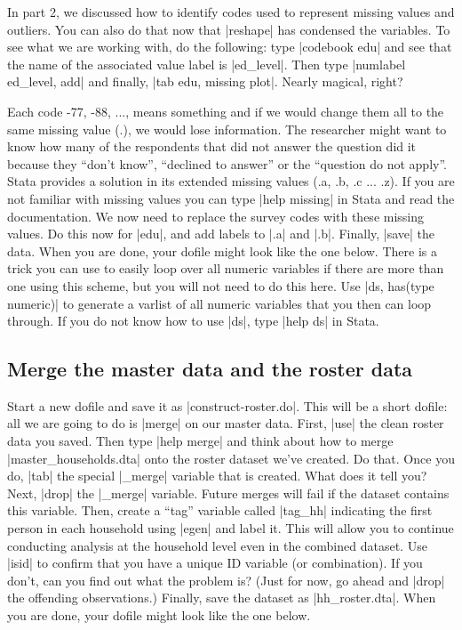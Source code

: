 \documentclass{tufte-handout}
\begin{document}
In part 2, we discussed how to identify codes
used to represent missing values and outliers.
You can also do that now that |reshape| has condensed the variables.
To see what we are working with, do the following:
type |codebook edu| and see that the name of
the associated value label is |ed_level|.
Then type |numlabel ed_level, add| and finally,
|tab edu, missing plot|. Nearly magical, right?

Each code -77, -88, ..., means something and
if we would change them all to the same missing value (.),
we would lose information.
The researcher might want to know how many
of the respondents that did not answer the question did it
because they “don’t know”, “declined to answer” or the “question do not apply”.
Stata provides a solution in its extended missing values (.a, .b, .c ... .z).
If you are not familiar with missing values you can type |help missing|
in Stata and read the documentation.
We now need to replace the survey codes with these missing values.
Do this now for |edu|, and add labels to |.a| and |.b|.
Finally, |save| the data.
When you are done, your dofile might look like the one below.
There is a trick you can use to easily loop over all numeric variables
if there are more than one using this scheme,
but you will not need to do this here.
Use |ds, has(type numeric)| to generate a varlist of all numeric variables
that you then can loop through.
If you do not know how to use |ds|, type |help ds| in Stata.

\subsection{Merge the master data and the roster data}

Start a new dofile and save it as |construct-roster.do|.
This will be a short dofile: all we are going to do is |merge| on our master data.
First, |use| the clean roster data you saved.
Then type |help merge| and think about how to merge
|master_households.dta| onto the roster dataset we’ve created. Do that.
Once you do, |tab| the special |_merge| variable that is created.
What does it tell you? Next, |drop| the |_merge| variable.
Future merges will fail if the dataset contains this variable.
Then, create a “tag” variable called |tag_hh|
indicating the first person in each household using |egen| and label it.
This will allow you to continue conducting analysis at the household level
even in the combined dataset.
Use |isid| to confirm that you have a unique ID variable (or combination).
If you don’t, can you find out what the problem is?
(Just for now, go ahead and |drop| the offending observations.)
Finally, save the dataset as |hh_roster.dta|.
When you are done, your dofile might look like the one below.
\end{document}
